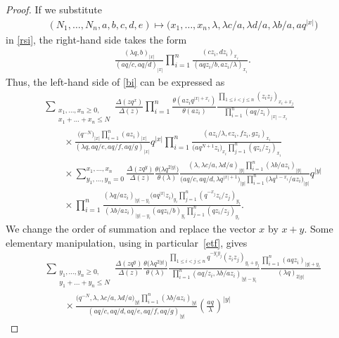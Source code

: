 \documentclass[pdftex]{sigma}
\numberwithin{equation}{section}
\begin{document}
\begin{proof}
If we substitute
 \begin{gather*}(N_1,\dots,N_n,a,b,c,d,e)\mapsto
\big(x_1,\dots,x_n,\lambda,\lambda c/a,\lambda d/a,\lambda b/a,aq^{|x|}\big)\end{gather*}
 in \eqref{rsi}, the right-hand side takes the form
\begin{gather*}\frac{(\lambda q,b)_{|x|}}{(aq/c,aq/d)_{|x|}}\prod\limits_{i=1}^n\frac{(cz_i,dz_i)_{x_i}}{(aqz_i/b,az_i/\lambda)_{x_i}}. \end{gather*}
Thus, the left-hand side of \eqref{bi} can be expressed as
\begin{gather*}
\sum_{\substack{x_1,\dots,x_n\geq 0,\\x_1+\dots+x_n\leq N}}
\frac{\Delta(zq^x)}{\Delta(z)}\prod\limits_{i=1}^n\frac{\theta(az_iq^{|x|+x_i})}{\theta(az_i)}
\frac{\prod\limits_{1\leq i<j\leq n}(z_iz_j)_{x_i+x_j}}{\prod\limits_{i=1}^n(aq/z_i)_{|x|-x_i}}\\
\qquad{} \times\frac{\big(q^{-N}\big)_{|x|}\prod\limits_{i=1}^n(az_i)_{|x|}}{(\lambda q,aq/e,aq/f,aq/g)_{|x|}} q^{|x|}\prod\limits_{i=1}^n
\frac{(az_i/\lambda,ez_i,fz_i,gz_i)_{x_i}}{\big(aq^{N+1}z_i\big)_{x_i}\prod\limits_{j=1}^n(qz_i/z_j)_{x_i}}\\
\qquad{}\times
\sum_{y_1,\dots,y_n=0}^{x_1,\dots,x_n}\frac{\Delta(zq^y)}{\Delta(z)}\frac{\theta\big(\lambda q^{2|y|}\big)}{\theta(\lambda)}
\frac{(\lambda,\lambda c/a,\lambda d/a)_{|y|}\prod\limits_{i=1}^n(\lambda b/az_i)_{|y|}}{\big(aq/c,aq/d,\lambda q^{|x|+1}\big)_{|y|}\prod\limits_{i=1}^n\big(\lambda q^{1-x_i}/az_i\big)_{|y|}} q^{|y|}\\
\qquad{} \times\prod\limits_{i=1}^n\frac{(\lambda q/az_i)_{|y|-y_i}\big(aq^{|x|}z_i\big)_{y_i}\prod\limits_{j=1}^n(q^{-x_j}z_i/z_j)_{y_i}}{(\lambda b/az_i)_{|y|-y_i}(aqz_i/b)_{y_i}\prod\limits_{j=1}^n(qz_i/z_j)_{y_i}}.
\end{gather*}
We change the order of summation and replace the vector $x$ by $x+y$. Some elementary manipulation, using in particular~\eqref{etf}, gives
\begin{gather*}
\sum_{\substack{y_1,\dots,y_n\geq 0,\\y_1+\dots+y_n\leq N}}
\frac{\Delta(zq^y)}{\Delta(z)}\frac{\theta\big(\lambda q^{2|y|}\big)}{\theta(\lambda)}
\frac{\prod\limits_{1\leq i<j\leq n}q^{-y_iy_j}(z_iz_j)_{y_i+y_j}}{\prod\limits_{i=1}^n(aq/z_i,\lambda b/az_i)_{|y|-y_i}}\frac{\prod\limits_{i=1}^n(aqz_i)_{|y|+y_i}}{(\lambda q)_{2|y|}}\\
\qquad{} \times\frac{\big(q^{-N},\lambda,\lambda c/a,\lambda d/a\big)_{|y|}\prod\limits_{i=1}^n(\lambda b/az_i)_{|y|}}{(aq/c,aq/d,aq/e,aq/f,aq/g)_{|y|}}\left(\frac{aq}{\lambda}\right)^{|y|}%

\end{gather*}
\end{proof}
\end{document}
